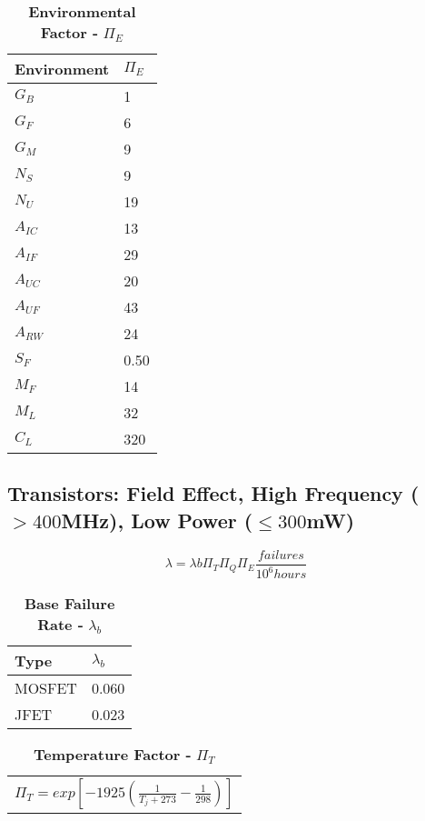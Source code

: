 \begin{table}
\caption{\textbf{Environmental Factor -} $\Pi_{E}$}
\label{table:envFactorMosLow}
\begin{tabular}{|l|m{10cm}|} \hline
\textbf{Environment} & $\Pi_{E}$ \\ \hline
$G_{B}$ & 1 \\ \hline
$G_{F}$ & 6 \\ \hline
$G_{M}$ & 9 \\ \hline
$N_{S}$ & 9 \\ \hline
$N_{U}$ & 19 \\ \hline
$A_{IC}$ & 13 \\ \hline
$A_{IF}$ & 29 \\ \hline
$A_{UC}$ & 20 \\ \hline
$A_{UF}$ & 43 \\ \hline
$A_{RW}$ & 24 \\ \hline
$S_{F}$ & 0.50 \\ \hline
$M_{F}$ & 14 \\ \hline
$M_{L}$ & 32 \\ \hline
$C_{L}$ & 320 \\ \hline
\end{tabular}
\end{table}



\subsection{Transistors: Field Effect, High Frequency ($> 400$MHz), Low Power ($\leq 300$mW)}
\label{subsection:transistors-field-effect-high-frequency-400mhz-low-power-300mw}

$$\lambda = \lambda{b} \Pi_{T} \Pi_{Q} \Pi_{E} \frac{failures}{10^{6} hours}$$


\begin{table}
\caption{\textbf{Base Failure Rate -} $\lambda_{b}$}
\label{table:baseFailRateMosHigh}
\begin{tabular}{|l|m{10cm}|} \hline
\textbf{Type} & $\lambda_{b}$ \\ \hline
MOSFET & 0.060 \\ \hline
JFET & 0.023 \\ \hline
\end{tabular}
\end{table}


\begin{table}
\caption{\textbf{Temperature Factor -} $\Pi_{T}$}
\label{table:tempFactorMosHigh}
\begin{tabular}{l} \hline
$\Pi_{T} = exp[-1925(\frac{1}{T_j + 273} - \frac{1}{298})]$ \\
\end{tabular}
\end{table}



